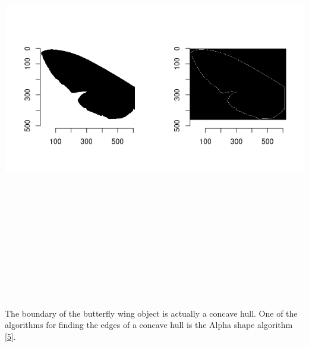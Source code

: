 \documentclass[
]{article}
\let\origfigure\figure
\let\endorigfigure\endfigure
\renewenvironment{figure}[1][2] {
    \expandafter\origfigure\expandafter[H]
} {
    \endorigfigure
}
\begin{document}
\begin{figure}
\centering
\includegraphics[width=\textwidth,height=7.29167in]{./img/Canny_edge_1.png}
\caption{Finding edges in a contrasting black and white image}
\end{figure}

The boundary of the butterfly wing object is actually a concave hull.
One of the algorithms for finding the edges of a concave hull is the
Alpha shape algorithm {[}\protect\hyperlink{ref-Alpha-shape}{5}{]}.
\end{document}

